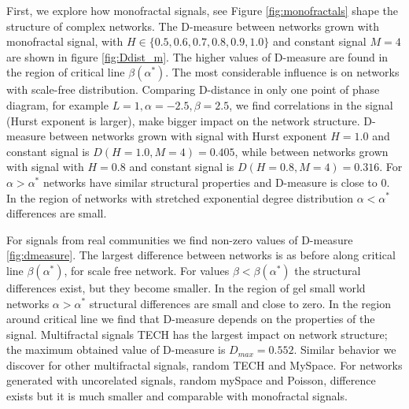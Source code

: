 First, we explore how monofractal signals, see Figure \ref{fig:monofractals} shape the structure of complex networks. The D-measure between networks grown with monofractal signal, with $H \in \{0.5, 0.6, 0.7, 0.8, 0.9, 1.0\}$ and constant signal $M=4$ are shown in figure \ref{fig:Ddist_m}. The higher values of D-measure are found in the region of critical line $\beta(\alpha^{*})$. The most considerable influence is on networks with scale-free distribution. Comparing D-distance in only one point of  phase diagram, for example $L=1, \alpha = -2.5, \beta = 2.5$, we find correlations in the signal (Hurst exponent is larger), make bigger impact on the network structure. D-measure between networks grown with signal with Hurst exponent $H=1.0$ and constant signal is $D(H=1.0, M=4) = 0.405$, while between networks grown with signal with $H=0.8$ and constant signal is $D(H=0.8, M=4) = 0.316$. For $\alpha>\alpha^{*}$ networks have similar structural properties and D-measure is close to 0. In the region of networks with stretched exponential degree distribution $\alpha<\alpha^{*}$  differences are small.  

For signals from real communities we find non-zero values of D-measure \ref{fig:dmeasure}. The largest difference between networks is as before along critical line $\beta(\alpha^{*})$, for scale free network. For values $\beta<\beta(\alpha^{*})$ the structural differences exist, but they become smaller. In the region of gel small world networks $\alpha>\alpha^{*}$ structural differences are small and close to zero. In the region around critical line we find that D-measure depends on the properties of the signal. Multifractal signals TECH has the largest impact on network structure; the maximum obtained value of D-measure is $D_{max}=0.552$. Similar behavior we discover for other multifractal signals, random TECH and MySpace. For networks generated with uncorelated signals, random mySpace and Poisson, difference exists but it is much smaller and comparable with monofractal signals.  


